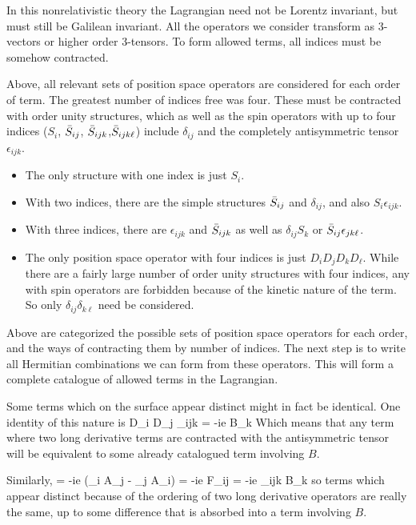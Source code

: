 In this nonrelativistic theory the Lagrangian need not be Lorentz invariant, but must still be Galilean invariant.  All the operators we consider transform as 3-vectors or higher order 3-tensors.  To form allowed terms, all indices must be somehow contracted.

Above, all relevant sets of position space operators are considered for each order of term.  The greatest number of indices free was four.  These must be contracted with order unity structures, which as well as the spin operators with up to four indices ($S_i$, $\bar{S}_{ij}$, $\bar{S}_{ijk}$,$\bar{S}_{ijk\ell}$) include $\delta_{ij}$ and the completely antisymmetric tensor $\epsilon_{ijk}$.

\begin{itemize}
\item The only structure with one index is just $S_i$.

\item With two indices, there are the simple structures $\bar{S}_{ij}$ and $\delta_{ij}$, and also $S_i \epsilon_{ijk}$.

\item With three indices, there are $\epsilon_{ijk}$ and $\bar{S}_{ijk}$ as well as $\delta_{ij} S_k$ or $\bar{S}_{ij} \epsilon_{jk\ell}$.

\item The only position space operator with four indices is just $D_i D_j D_k D_\ell$.  While there are a fairly large number of order unity structures with four indices, any with spin operators are forbidden because of the kinetic nature of the term.  So only $\delta_{ij} \delta_{k\ell}$ need be considered.
\end{itemize}

Above are categorized the possible sets of position space operators for each order, and the ways of contracting them by number of indices.  The next step is to write all Hermitian combinations we can form from these operators.  This will form a complete catalogue of allowed terms in the Lagrangian.

Some terms which on the surface appear distinct might in fact be identical.  One identity of this nature is
\beq
	D_i D_j \epsilon_{ijk} = -ie B_k 
\eeq  
Which means that any term where two long derivative terms are contracted with the antisymmetric tensor will be equivalent to some already catalogued term involving $B$.

Similarly, 
\beq
	[D_i, D_j] = -ie (\partial_i A_j - \partial_j A_i) = -ie F_{ij} = -ie \epsilon_{ijk} B_k 
\eeq
so terms which appear distinct because of the ordering of two long derivative operators are really the same, up to some difference that is absorbed into a term involving $B$.  

